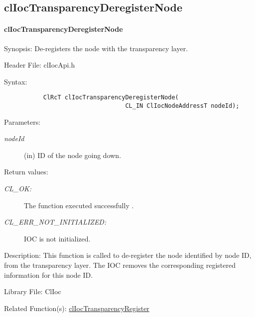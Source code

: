 \begin{flushleft}
\subsection{clIocTransparencyDeregisterNode}
\hypertarget{pageioc120}{}\paragraph{cl\-Ioc\-Transparency\-Deregister\-Node}\label{pageioc120}
\begin{Desc}
\item[Synopsis:]De-registers the node with the transparency layer.\end{Desc}
\begin{Desc}
\item[Header File:]clIocApi.h\end{Desc}
\begin{Desc}
\item[Syntax:]

\footnotesize\begin{verbatim}           ClRcT clIocTransparencyDeregisterNode(
 			                      CL_IN ClIocNodeAddressT nodeId);
\end{verbatim}
\normalsize
\end{Desc}
\begin{Desc}
\item[Parameters:]
\begin{description}
\item[{\em node\-Id}](in) ID of the node going down.\end{description}
\end{Desc}
\begin{Desc}
\item[Return values:]
\begin{description}
\item[{\em CL\_\-OK:}]The function executed successfully .
\item[{\em CL\_\-ERR\_\-NOT\_\-INITIALIZED:}]IOC is not initialized.
\end{description}
\end{Desc}
\begin{Desc}
\item[Description:] This function is called to de-register the node identified by node ID,
   from the transparency layer. The IOC removes the corresponding
    registered information for this node ID.
\end{Desc}
\begin{Desc}
\item[Library File:]Cl\-Ioc\end{Desc}
\begin{Desc}
\item[Related Function(s):]\hyperlink{pageioc209}{clIocTransparencyRegister} \end{Desc}
\newpage



\end{flushleft}

